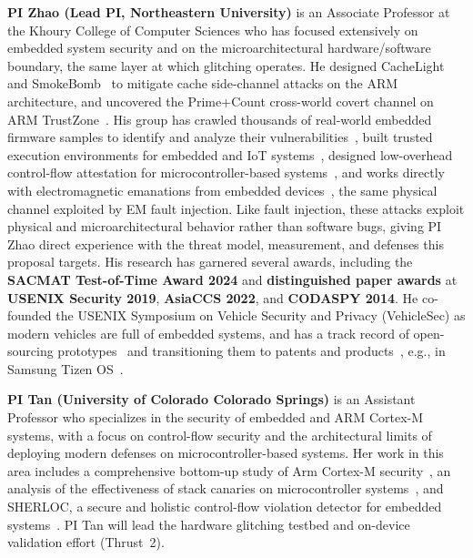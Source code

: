 \noindent\textbf{PI Zhao (Lead PI, Northeastern University)} is an Associate Professor at the Khoury College of Computer Sciences who has focused extensively on embedded system security and on the microarchitectural hardware/software boundary, the same layer at which glitching operates.
He designed CacheLight~\cite{gutierrez2018cachelight} and SmokeBomb~\cite{cho2020smokebomb} to mitigate cache side-channel attacks on the ARM architecture, and uncovered the Prime+Count cross-world covert channel on ARM TrustZone~\cite{cho2018prime}.
His group has crawled thousands of real-world embedded firmware samples to identify and analyze their vulnerabilities~\cite{nino24firware}, built trusted execution environments for embedded and IoT systems~\cite{zhao24tee, byotee24}, designed low-overhead control-flow attestation for microcontroller-based systems~\cite{armanuzzaman2025enola}, and works directly with electromagnetic emanations from embedded devices~\cite{Moradihaghighi2026fuzzemup}, the same physical channel exploited by EM fault injection.
Like fault injection, these attacks exploit physical and microarchitectural behavior rather than software bugs, giving PI Zhao direct experience with the threat model, measurement, and defenses this proposal targets.
His research has garnered several awards, including the \textbf{SACMAT Test-of-Time Award 2024} and \textbf{distinguished paper awards} at \textbf{USENIX Security 2019}, \textbf{AsiaCCS 2022}, and \textbf{CODASPY 2014}.
He co-founded the USENIX Symposium on Vehicle Security and Privacy (VehicleSec) as modern vehicles are full of embedded systems, and has a track record of open-sourcing prototypes~\cite{ma2023dac, zhang2018secore, cho2020smokebomb, fengformal2021, lamp2019exsol} and transitioning them to patents and products~\cite{cho2020smokebomb, ahn2015methods, tu2017systems, isign}, e.g., in Samsung Tizen OS~\cite{Tizen}.

\noindent\textbf{PI Tan (University of Colorado Colorado Springs)} is an Assistant Professor who specializes in the security of embedded and ARM Cortex-M systems, with a focus on control-flow security and the architectural limits of deploying modern defenses on microcontroller-based systems.
Her work in this area includes a comprehensive bottom-up study of Arm Cortex-M security~\cite{tan24sok}, an analysis of the effectiveness of stack canaries on microcontroller systems~\cite{tan24canary}, and SHERLOC, a secure and holistic control-flow violation detector for embedded systems~\cite{tan2023sherloc}.
PI Tan will lead the hardware glitching testbed and on-device validation effort (Thrust~2). %

